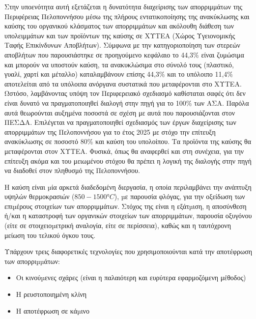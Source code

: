 \documentclass[12pt]{article}
\begin{document}
	Στην  υποενότητα αυτή εξετάζεται η δυνατότητα διαχείρισης των απορριμμάτων της Περιφέρειας Πελοποννήσου μέσω της πλήρους εντατικοποίησης της ανακύκλωσης και καύσης του οργανικού κλάσματος  των απορριμμάτων και ακόλουθη διάθεση των υπολειμμάτων και των προϊόντων της καύσης σε ΧΥΤΕΑ (Χώρος Υγειονομικής Ταφής Επικίνδυνων Αποβλήτων). Σύμφωνα με την κατηγοριοποίηση των στερεών αποβλήτων που παρουσιάστηκε σε προηγούμενο κεφάλαιο το 44,3\% είναι ζυμώσιμα και μπορούν να υποστούν καύση, τα ανακυκλώσιμα στο σύνολό τους (πλαστικό, γυαλί, χαρτί και μέταλλο) καταλαμβάνουν επίσης 44,3\% και το υπόλοιπο 11,4\% αποτελείται από τα υπόλοιπα ανόργανα συστατικά που μεταφέρονται στο ΧΥΤΕΑ. Ωστόσο, λαμβάνοντας υπόψη τον Περιφερειακό σχεδιασμό καθίσταται σαφές ότι δεν είναι δυνατό να πραγματοποιηθεί διαλογή στην πηγή για το 100\% των ΑΣΑ. Παρόλα αυτά θεωρούνται αυξημένα ποσοστά σε σχέση με αυτά που παρουσιάζονται στον ΠΕΣΔΑ. Επιλέγεται να πραγματοποιηθεί σχεδιασμός των έργων διαχείρισης των απορριμμάτων της Πελοποννήσου για το έτος 2025 με στόχο την επίτευξη ανακύκλωσης σε ποσοστό 80\% και καύση του υπολοίπου. Τα προϊόντα της καύσης θα μεταφέρονται στον ΧΥΤΕΑ. Φυσικά, όπως θα αναφερθεί και στη συνέχεια, για την επίτευξη ακόμα και του μειωμένου στόχου θα πρέπει η λογική της διαλογής στην πηγή να διαδοθεί στον πληθυσμό της Πελοποννήσου.
	
	Η καύση είναι µία αρκετά διαδεδομένη διεργασία, η οποία περιλαμβάνει την ανάπτυξη υψηλών θερμοκρασιών ($850-1500°C$), µε παρουσία φλόγας, για την οξείδωση των επιµέρους στοιχείων των απορριμμάτων. Στόχος της είναι η εξάτµιση, η αποσύνθεση ή/και η καταστροφή των οργανικών στοιχείων των απορριμμάτων, παρουσία οξυγόνου (είτε σε στοιχειοµετρική αναλογία, είτε σε περίσσεια), καθώς και η ταυτόχρονη μείωση του τελικού όγκου τους.
	
	Υπάρχουν τρεις διαφορετικές τεχνολογίες που χρησιμοποιούνται κατά την αποτέφρωση των απορριµµάτων:
	
	\begin{itemize}
		\item Οι κινούµενες σχάρες (είναι η παλαιότερη και ευρύτερα εφαρμοζόμενη μέθοδος) 
		\item Η ρευστοποιημένη κλίνη 
		\item Η αποτέφρωση σε κάµινο 
	\end{itemize} 
\end{document}

